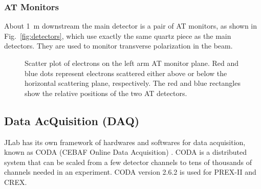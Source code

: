 \subsubsection{AT Monitors}
About 1~m downstream the main detector is a pair of AT monitors, as shown 
in Fig.~\ref{fig:detectors}, which use exactly the same quartz piece as the 
main detectors. They are used to monitor transverse polarization in the beam.
\begin{figure}[!h]
    \centering
    \caption[Scatter plot of electrons on the left arm AT monitor plane.]
    {Scatter plot of electrons on the left arm AT monitor plane. 
    Red and blue dots represent electrons scattered either above or below the
    horizontal scattering plane, respectively. The red and blue rectangles
    show the relative positions of the two AT detectors. 
    }
\end{figure}

\subsection{Data AcQuisition (DAQ)}
JLab has its own framework of hardwares and softwares for data acquisition, known
as CODA (CEBAF Online Data Acquisition) \cite{CODA}. CODA is a distributed
system that can be scaled from a few detector channels to tens of thousands of
channels needed in an experiment. CODA version 2.6.2 is used for PREX-II and CREX.

